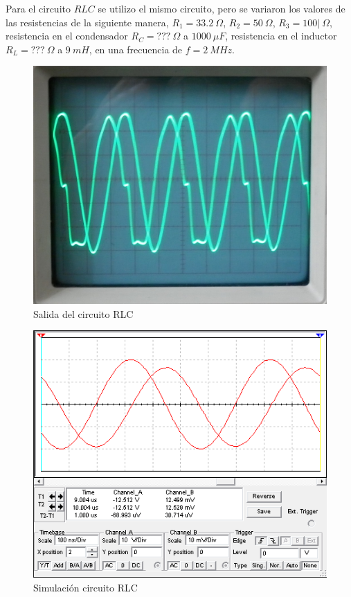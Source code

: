 \documentclass[twocolumn]{IEEEtran}
\begin{document}
\noindent
Para el circuito $RLC$ se utilizo el mismo circuito, pero se variaron los valores de las resistencias de la siguiente manera, $R_1 = 33.2\ \Omega$, $R_2 = 50\ \Omega$, $R_3 = 100|\ \Omega$, resistencia en el condensador $R_C = ???\ \Omega$ a $1000\ \mu F$, resistencia en el inductor $R_L = ???\ \Omega$ a $9\ mH$, en una frecuencia de $f=2\ MHz$.\\
\begin{figure}[H]
	\centering
		\includegraphics[scale=0.17]{236.png}
	\caption{Salida del circuito RLC}
	\label{figp5}
\end{figure}
\begin{figure}[H]
	\centering
		\includegraphics[scale=0.4]{RLCsim.PNG}
	\caption{Simulación circuito RLC}
	\label{fig1c}
\end{figure}
\noindent
\end{document}
